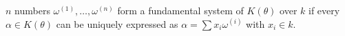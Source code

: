 $n$ numbers $\omega^{(1)},\ldots,\omega^{(n)}$ form a fundamental system of $K(\theta)$ over $k$ if every $\alpha \in K(\theta)$ can be uniquely expressed as $\alpha = \sum x_i\omega^{(i)}$ with $x_i \in k$.
